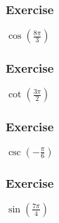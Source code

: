 \documentclass[12pt]{beamer}
\begin{document}
\begin{frame} %
	\frametitle{Exercise}
	\vspace*{\fill}
	\vspace*{\fill}
	\vspace*{\fill}
	\vspace*{\fill}
	\initclock
	\LARGE
	\begin{center}
		$\cos{\left(\frac{8\pi}{3}\right)}$ %
	\end{center}
	\vspace*{\fill}
	\vspace*{\fill}
	\vspace*{\fill}
	\vspace*{\fill}
	\crono
\end{frame}
\begin{frame}
	\frametitle{Exercise}
	\vspace*{\fill}
	\vspace*{\fill}
	\vspace*{\fill}
	\vspace*{\fill}
	\initclock
	\LARGE
	\begin{center}
		$\cot{\left(\frac{3\pi}{2}\right)}$ %
	\end{center}
	\vspace*{\fill}
	\vspace*{\fill}
	\vspace*{\fill}
	\vspace*{\fill}
	\crono
\end{frame}
\begin{frame}
	\frametitle{Exercise}
	\vspace*{\fill}
	\vspace*{\fill}
	\vspace*{\fill}
	\vspace*{\fill}
	\initclock
	\LARGE
	\begin{center}
		$\csc{\left(-\frac{\pi}{6}\right)}$ %
	\end{center}
	\vspace*{\fill}
	\vspace*{\fill}
	\vspace*{\fill}
	\vspace*{\fill}
	\crono
\end{frame}
\begin{frame}
	\frametitle{Exercise}
	\vspace*{\fill}
	\vspace*{\fill}
	\vspace*{\fill}
	\vspace*{\fill}
	\initclock
	\LARGE
	\begin{center}
		$\sin{\left(\frac{7\pi}{4}\right)}$ %
	\end{center}
	\vspace*{\fill}
	\vspace*{\fill}
	\vspace*{\fill}
	\vspace*{\fill}
	\crono
\end{frame}
\end{document}
